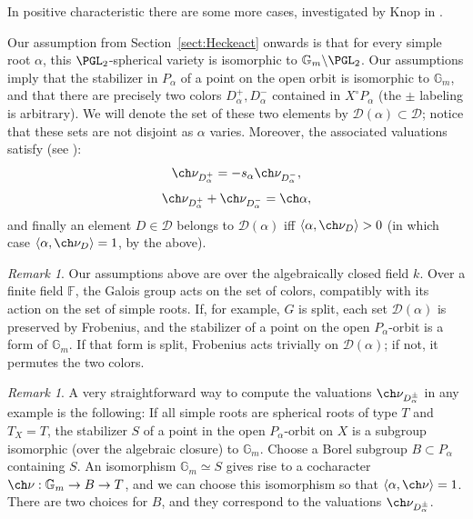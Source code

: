 \documentclass[final]{amsart}
\theoremstyle{remark}
\newtheorem{rem}[subsubsection]{Remark}
\theoremstyle{definition}
\numberwithin{equation}{section}
\begin{document}
In positive characteristic there are some more cases, investigated by Knop in \cite{Knop-sphericalroots}. 

Our assumption from Section~\ref{sect:Heckeact} onwards is that for every simple root $\alpha$, this $\PGL_2$-spherical variety is isomorphic to $\mathbb G_m\backslash \PGL_2$. Our assumptions imply that the stabilizer in $P_\alpha$ of a point on the open orbit is isomorphic to $\mathbb G_m$, and that there are precisely two colors $D_\alpha^+, D_\alpha^-$ contained in $X^\circ P_\alpha$ (the $\pm $ labeling is arbitrary). We will denote the set of these two elements by $\mathcal D(\alpha)\subset\mathcal D$; notice that these sets are not disjoint as $\alpha$ varies. Moreover, the associated valuations satisfy (see \cite[\S 3.4]{Lun97}):
\[ \ch\nu_{D^+_\alpha} = -s_\alpha \ch\nu_{D^-_\alpha},\]
\[ \ch\nu_{D^+_\alpha} + \ch\nu_{D^-_\alpha} = \ch\alpha, \]
and finally an element $D\in \mathcal D$ belongs to $\mathcal D(\alpha)$ iff $\left<\alpha,\ch\nu_{D}\right> >0$ (in which case $\left<\alpha,\ch\nu_{D}\right> =1$, by the above). 

\begin{rem}
 Our assumptions above are over the algebraically closed field $k$. Over a finite field $\mathbb F$, the Galois group acts on the set of colors, compatibly with its action on the set of simple roots. If, for example, $G$ is split, each set $\mathcal D(\alpha)$ is preserved by Frobenius, and the stabilizer of a point on the open $P_\alpha$-orbit is a form of $\mathbb G_m$. If that form is split, Frobenius acts trivially on $\mathcal D(\alpha)$; if not, it permutes the two colors.
\end{rem}


\begin{rem}\label{rem:valuation}
A very straightforward way to compute the valuations $\ch\nu_{D^{\pm}_\alpha}$ in any example is the following: If all simple roots are spherical roots of type $T$ and $T_X=T$, the stabilizer $S$ of a point in the open $P_\alpha$-orbit on $X$ is a subgroup isomorphic (over the algebraic closure) to $\mathbb G_m$. Choose a Borel subgroup $B\subset P_\alpha$ containing $S$. An isomorphism $\mathbb G_m\simeq S$ gives rise to a cocharacter $\ch\nu:\mathbb G_m \to B\to T$, and we can choose this isomorphism so that $\left<\alpha, \ch\nu \right> = 1$. There are two choices for $B$, and they correspond to the valuations $\ch\nu_{D^{\pm}_\alpha}$.
\end{rem}
\end{document}
